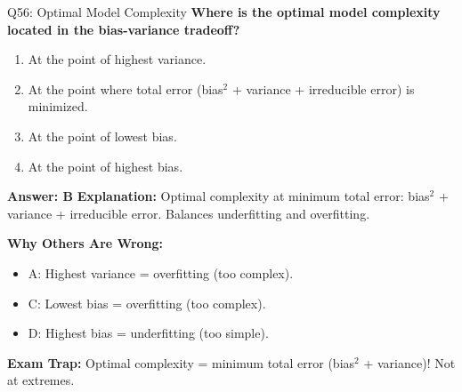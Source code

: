 \documentclass[8pt]{beamer}
\begin{document}
	\begin{frame}{Q56: Optimal Model Complexity}
		\fontsize{6.5}{7.5}\selectfont
		\textbf{Where is the optimal model complexity located in the bias-variance tradeoff?}
		
		\begin{enumerate}
			\item At the point of highest variance.
			\item At the point where total error (bias$^2$ + variance + irreducible error) is minimized.
			\item At the point of lowest bias.
			\item At the point of highest bias.
		\end{enumerate}
		
		\vspace{0.05cm}
		\textcolor{myblue}{\textbf{Answer: B}}
		\vspace{0.05cm}
		\textcolor{myblue}{\textbf{Explanation:}} Optimal complexity at minimum total error: bias$^2$ + variance + irreducible error. Balances underfitting and overfitting.
		
		\vspace{0.05cm}
		\textcolor{myred}{\textbf{Why Others Are Wrong:}}
		\begin{itemize}
			\item \textcolor{myred}{A:} Highest variance = overfitting (too complex).
			\item \textcolor{myred}{C:} Lowest bias = overfitting (too complex).
			\item \textcolor{myred}{D:} Highest bias = underfitting (too simple).
		\end{itemize}
		
		\textcolor{myred}{\textbf{Exam Trap:}} Optimal complexity = \textcolor{myblue}{minimum total error} (bias$^2$ + variance)! Not at extremes.
	\end{frame}
	
\end{document}
